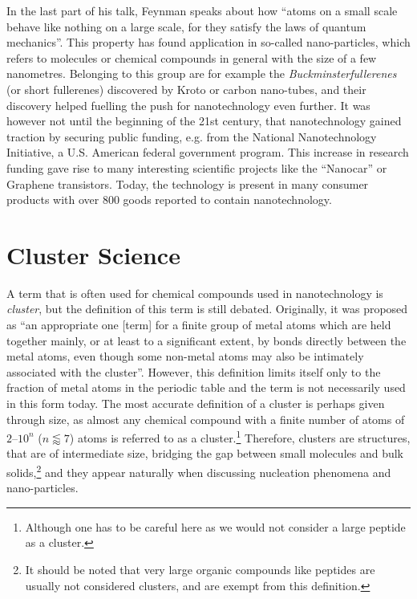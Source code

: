 In the last part of his talk, Feynman speaks about how ``atoms on a small scale
behave like nothing on a large scale, for they satisfy the laws of quantum
mechanics''. This property has found application in so-called nano-particles,
which refers to molecules or chemical compounds in general with the size of a
few nanometres. Belonging to this group are for example the
\emph{Buckminsterfullerenes} (or short fullerenes) discovered by
Kroto\autocite{Kroto_C60Buckminsterfullerene_1985} or carbon
nano-tubes\autocite{Iijima_Helicalmicrotubulesgraphitic_1991}, and their
discovery helped fuelling the push for nanotechnology even further. It was
however not until the beginning of the 21st century, that nanotechnology gained
traction by securing public funding, e.g. from the National Nanotechnology
Initiative, a U.S. American federal government program. This increase in
research funding gave rise to many interesting scientific projects like the
``Nanocar''\autocite{Kudernac_Electricallydrivendirectional_2011} or Graphene
transistors.\autocite{Wu_Highfrequencyscaledgraphene_2011} Today, the technology
is present in many consumer products with over 800 goods reported to contain
nanotechnology.\autocite{Vance_Nanotechnologyrealworld_2015}

\section{Cluster Science}
\label{sec:ClusterScience}

A term that is often used for chemical compounds used in nanotechnology is
\emph{cluster}, but the definition of this term is still debated. Originally, it
was proposed as ``an appropriate one [term] for a finite group of metal atoms
which are held together mainly, or at least to a significant extent, by bonds
directly between the metal atoms, even though some non-metal atoms may also be
intimately associated with the
cluster''.\autocite{Cotton_MetalAtomClusters_1964} However, this definition
limits itself only to the fraction of metal atoms in the periodic table and the
term is not necessarily used in this form today. The most accurate definition of
a cluster is perhaps given through size, as almost any chemical compound with a
finite number of atoms of $2$--$10^n$ ($n\lessapprox 7$) atoms is referred to as
a
cluster.\footnote{Although one has to be careful here as we would not consider a large peptide as a cluster.} \autocite{Johnston_Atomicmolecularclusters_2002,Wales_Energylandscapes_2003}
Therefore, clusters are structures, that are of intermediate size, bridging the
gap between small molecules and bulk solids,\footnote{It should be noted that
very large organic compounds like peptides are usually not considered clusters,
and are exempt from this definition.} and they appear naturally when discussing
nucleation phenomena and nano-particles. 

